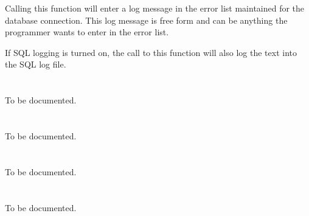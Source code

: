 \label{wxdblogerror}



Calling this function will enter a log message in the error list maintained
for the database connection.  This log message is free form and can be
anything the programmer wants to enter in the error list.

If SQL logging is turned on, the call to this function will also log the
text into the SQL log file.



\label{wxdbgettypeinf}




\section{}\label{wxdbcolinf}

To be documented.

\section{}\label{wxdbcolfor}

To be documented.

\section{}\label{wxdbinf}

To be documented.

\section{}\label{wxdbtable}

To be documented.

